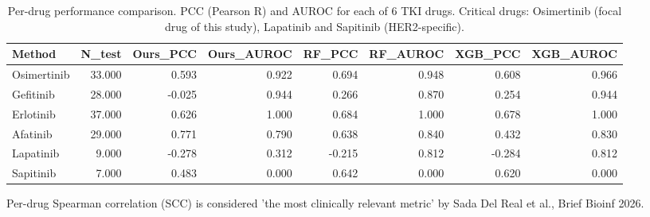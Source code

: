 \begin{table}[htbp]
\centering
\caption{Per-drug performance comparison. PCC (Pearson R) and AUROC for each of 6 TKI drugs. Critical drugs: Osimertinib (focal drug of this study), Lapatinib and Sapitinib (HER2-specific).}
\label{tab:perdrug}
\small
\begin{tabular}{lrrrrrrr}
\toprule
\textbf{Method} & \textbf{N_test} & \textbf{Ours_PCC} & \textbf{Ours_AUROC} & \textbf{RF_PCC} & \textbf{RF_AUROC} & \textbf{XGB_PCC} & \textbf{XGB_AUROC} \\
\midrule
Osimertinib & 33.000 & 0.593 & 0.922 & 0.694 & 0.948 & 0.608 & 0.966 \\
Gefitinib & 28.000 & -0.025 & 0.944 & 0.266 & 0.870 & 0.254 & 0.944 \\
Erlotinib & 37.000 & 0.626 & 1.000 & 0.684 & 1.000 & 0.678 & 1.000 \\
Afatinib & 29.000 & 0.771 & 0.790 & 0.638 & 0.840 & 0.432 & 0.830 \\
Lapatinib & 9.000 & -0.278 & 0.312 & -0.215 & 0.812 & -0.284 & 0.812 \\
Sapitinib & 7.000 & 0.483 & 0.000 & 0.642 & 0.000 & 0.620 & 0.000 \\
\bottomrule
\end{tabular}
\vspace{2pt}
\begin{minipage}{\textwidth}
\footnotesize Per-drug Spearman correlation (SCC) is considered 'the most clinically relevant metric' by Sada Del Real et al., Brief Bioinf 2026.
\end{minipage}
\end{table}